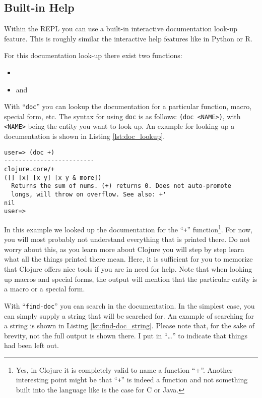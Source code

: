 \subsection{Built-in Help}
Within the REPL you can use a built-in interactive documentation look-up feature.
This is roughly similar the interactive help features like in Python or R.

For this documentation look-up there exist two functions:
\begin{itemize}
  \item {}
  \item and 
\end{itemize}

With ``\texttt{doc}'' you can lookup the documentation for a particular function, macro, special form, etc.
The syntax for using \texttt{doc} is as follows: \texttt{(doc <NAME>)}, with \texttt{<NAME>} being the entity you want to look up.
An example for looking up a documentation is shown in Listing \vref{lst:doc_lookup}.

\begin{lstlisting}[label=lst:doc_lookup, caption=Documentation Look-up]
user=> (doc +)
-------------------------
clojure.core/+
([] [x] [x y] [x y & more])
  Returns the sum of nums. (+) returns 0. Does not auto-promote
  longs, will throw on overflow. See also: +'
nil
user=>
\end{lstlisting}

In this example we looked up the documentation for the ``\texttt{+}'' function\footnote{Yes, in Clojure it is completely valid to name a function ``+''. Another interesting point might be that ``\texttt{+}'' is indeed a function and not something built into the language like is the case for C or Java.}.
For now, you will most probably not understand everything that is printed there.
Do not worry about this, as you learn more about Clojure you will step by step learn what all the things printed there mean.
Here, it is sufficient for you to memorize that Clojure offers nice tools if you are in need for help.
Note that when looking up macros and special forms, the output will mention that the particular entity is a macro or a special form.

With ``\texttt{find-doc}'' you can search in the documentation.
In the simplest case, you can simply supply a string that will be searched for.
An example of searching for a string is shown in Listing \vref{lst:find-doc_string}.
Please note that, for the sake of brevity, not the full output is shown there.
I put in ``\ldots'' to indicate that things had been left out.

